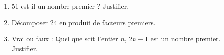 
\begin{enumerate}
\item  51 est-il un nombre premier ? Justifier.
\item  Décomposer 24 en produit de facteurs premiers.
\item Vrai ou faux : Quel que soit l'entier $n$, $2n-1$ est un nombre premier. Justifier.
\end{enumerate}